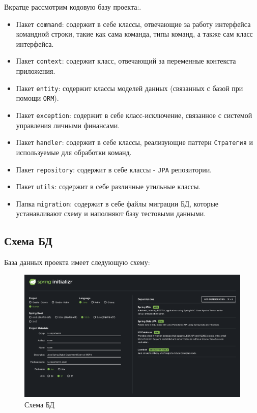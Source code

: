 \documentclass[a4paper, 14pt]{article}
\begin{document}
Вкратце рассмотрим кодовую базу проекта:.

\begin{itemize}
	\item Пакет \texttt{command}: содержит в себе классы, отвечающие за работу интерфейса командной строки, такие как сама команда, типы команд, а также сам класс интерфейса.
	\item Пакет \texttt{context}: содержит класс, отвечающий за переменные контекста приложения.
	\item Пакет \texttt{entity}: содержит классы моделей данных (связанных с базой при помощи \texttt{ORM}).
	\item Пакет \texttt{exception}: содержит в себе класс-исключение, связанное с системой управления личными финансами.
	\item Пакет \texttt{handler}: содержит в себе классы, реализующие паттерн \texttt{Стратегия} и используемые для обработки команд.
	\item Пакет \texttt{repository}: содержит в себе классы - \texttt{JPA} репозитории.
	\item Пакет \texttt{utils}: содержит в себе различные утильные классы.
	\item Папка \texttt{migration}: содержит в себе файлы миграции БД, которые устанавливают схему и наполняют базу тестовыми данными.
\end{itemize}

\subsection{Схема БД}

База данных проекта имеет следующую схему:

\begin{figure}[H]
	\centering
	\includegraphics[width=17cm]{resources/1.png}
	\caption{Схема БД}
\end{figure}
\end{document}
